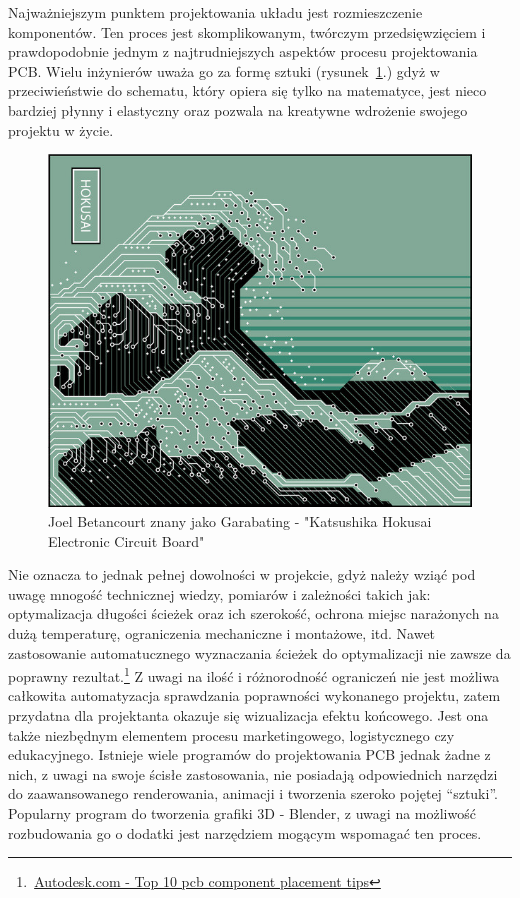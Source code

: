 \documentclass{xmgr}
\begin{document}
    Najważniejszym punktem projektowania układu jest rozmieszczenie komponentów. Ten proces jest skomplikowanym, twórczym przedsięwzięciem i prawdopodobnie jednym z najtrudniejszych aspektów procesu projektowania PCB. Wielu inżynierów uważa go za formę sztuki (rysunek~\ref{RYS.1}.) gdyż w przeciwieństwie do schematu, który opiera się tylko na matematyce, jest nieco bardziej płynny i elastyczny oraz pozwala na kreatywne wdrożenie swojego projektu w życie.

\begin{figure}[!tbh]
\centering
\includegraphics[width=0.9\hsize]{fig/hokusai}
\caption{Joel Betancourt znany jako Garabating - "Katsushika Hokusai Electronic Circuit Board"\label{RYS.1}}
\end{figure}

Nie oznacza to jednak pełnej dowolności w projekcie, gdyż należy wziąć pod uwagę mnogość technicznej wiedzy, pomiarów i zależności takich jak: optymalizacja długości ścieżek oraz ich szerokość, ochrona miejsc narażonych na dużą temperaturę, ograniczenia mechaniczne i montażowe, itd. Nawet zastosowanie automatucznego wyznaczania ścieżek do optymalizacji nie zawsze da poprawny rezultat.\footnote{\,\href{https://www.autodesk.com/products/eagle/blog/top-10-pcb-component-placement-tips-pcb-beginner/}{Autodesk.com - Top 10 pcb component placement tips}} Z uwagi na ilość i różnorodność ograniczeń nie jest możliwa całkowita automatyzacja sprawdzania poprawności wykonanego projektu, zatem przydatna dla projektanta okazuje się wizualizacja efektu końcowego. Jest ona także niezbędnym elementem procesu marketingowego, logistycznego czy edukacyjnego. Istnieje wiele programów do projektowania PCB jednak żadne z nich, z uwagi na swoje ścisłe zastosowania, nie posiadają odpowiednich narzędzi do zaawansowanego renderowania, animacji i tworzenia szeroko pojętej “sztuki”. Popularny program do tworzenia grafiki 3D - Blender, z uwagi na możliwość rozbudowania go o dodatki jest narzędziem mogącym wspomagać ten proces.
\end{document}
